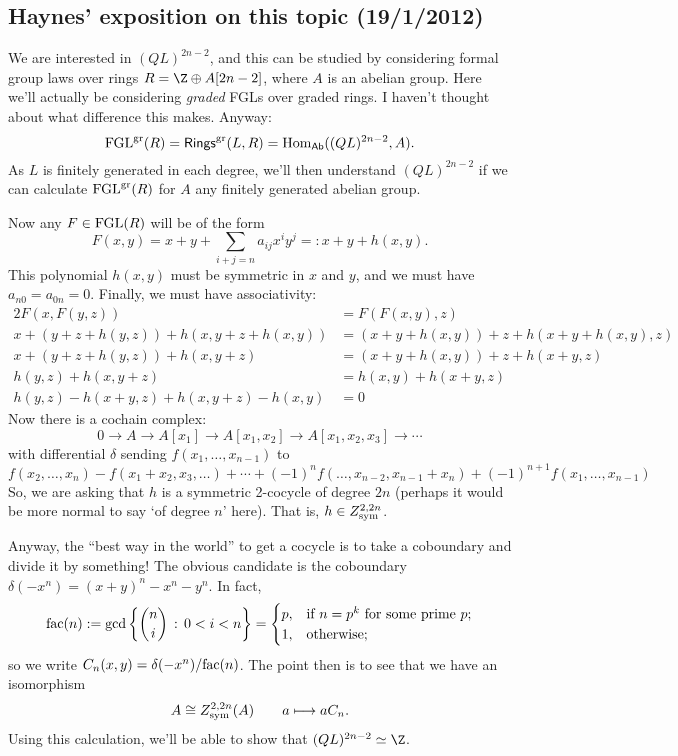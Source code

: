 \documentclass[11pt]{article}
\newcommand{\FGL}{\textup{FGL}}
\begin{document}
\begin{Formal Group Laws}
\begin{shaded}
\subsection*{Haynes' exposition on this topic (19/1/2012)}
We are interested in $(QL)^{2n-2}$, and this can be studied by considering formal group laws over rings $R=\Z\oplus A[2n-2]$, where $A$ is an abelian group. Here we'll actually be considering \emph{graded} FGLs over graded rings. I haven't thought about what difference this makes. Anyway:
\[\FGL^{\textup{gr}}(R)=\Rings^\textup{gr}(L,R)=\Hom_{\mathsf{Ab}}((QL)^{2n-2},A).\]
As $L$ is finitely generated in each degree, we'll then understand $(QL)^{2n-2}$ if we can calculate $\FGL^{\textup{gr}}(R)$ for $A$ any finitely generated abelian group.

Now any $F\in\FGL(R)$ will be of the form 
\[F(x,y)=x+y+\sum_{i+j=n}a_{ij}x^iy^j=:x+y+h(x,y).\]
This polynomial $h(x,y)$ must be symmetric in $x$ and $y$, and we must have $a_{n0}=a_{0n}=0$. Finally, we must have associativity:
\begin{alignat*}{2}
F(x,F(y,z))
&=
F(F(x,y),z)%
\\
x+(y+z+h(y,z))+h(x,y+z+h(x,y))
&=
(x+y+h(x,y))+z+h(x+y+h(x,y),z)%
\\
x+(y+z+h(y,z))+h(x,y+z)
&=
(x+y+h(x,y))+z+h(x+y,z)%
\\
h(y,z)+h(x,y+z)
&=
h(x,y)+h(x+y,z)%
\\
h(y,z)-h(x+y,z)+h(x,y+z)-h(x,y)
&=
0
\end{alignat*}
Now there is a cochain complex:
\[0\to A\to A[x_1]\to A[x_1,x_2]\to A[x_1,x_2,x_3]\to\cdots\]
with differential $\delta$ sending $f(x_1,\ldots,x_{n-1})$ to
\[f(x_2,\ldots,x_n)-f(x_1+x_2,x_3,\ldots)+\cdots+(-1)^{n} f(\ldots,x_{n-2},x_{n-1}+x_n)+(-1)^{n+1} f(x_1,\ldots,x_{n-1})\]
So, we are asking that $h$ is a symmetric 2-cocycle of degree $2n$ (perhaps it would be more normal to say `of degree $n$' here). That is, $h\in Z_{\textup{sym}}^{2,2n}$.

\INDENT Anyway, the ``best way in the world'' to get a cocycle is to take a coboundary and divide it by something! The obvious candidate is the coboundary $\delta(-x^n)=(x+y)^n-x^n-y^n$. In fact, 
\[\textup{fac}(n):=\gcd\left\{{n\choose i}\,:\,0<i<n\right\}=
\begin{cases}
p,&\textup{if }n=p^k\textup{ for some prime $p$};\\
1,&\textup{otherwise};
\end{cases}\]
so we write $C_n(x,y)=\delta(-x^n)/\textup{fac}(n)$. The point then is to see that we have an isomorphism
\[A\cong Z^{2,2n}_{\textup{sym}}(A)\qquad a\mapsto aC_n.\]
Using this calculation, we'll be able to show that $(QL)^{2n-2}\simeq \Z$.


\end{shaded}
\end{Formal Group Laws}
\end{document}

